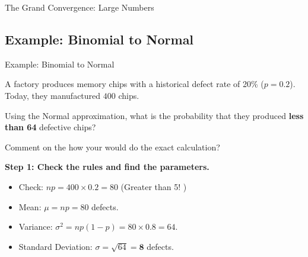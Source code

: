 \begin{frame}{The Grand Convergence: Large Numbers}
\end{frame}

\subsection{Example: Binomial to Normal}
\begin{frame}[allowframebreaks]{Example: Binomial to Normal}
    \begin{example}
        A factory produces memory chips with a historical defect rate of 20\% ($p = 0.2$). Today, they manufactured $400$ chips. 
        
        Using the Normal approximation, what is the probability that they produced \textbf{less than 64} defective chips?
        
        Comment on the how your would do the exact calculation?
    \end{example}


    \begin{solution}
        \textbf{Step 1: Check the rules and find the parameters.}
        \begin{itemize}
            \item Check: $np = 400 \times 0.2 = 80$ (Greater than 5! \checkmark)
            \item Mean: $\mu = np = 80$ defects.
            \item Variance: $\sigma^2 = np(1-p) = 80 \times 0.8 = 64$.
            \item Standard Deviation: $\sigma = \sqrt{64} = \mathbf{8}$ defects.
        \end{itemize}
        

\end{solution}
\end{frame}
